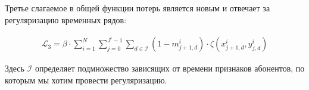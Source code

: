 \documentclass{article}
\begin{document}
Третье слагаемое в общей функции потерь является новым и отвечает за регуляризацию временных рядов: 

\begin{equation}
	\begin{aligned}
	\mathcal{L}_3=\beta\cdot\sum_{i=1}^N\sum_{j=0}^{J^i-1}\sum_{d\in\mathcal{I}}(1-m_{j+1,d}^i)\cdot\zeta(x_{j+1,d}^i,y_{j,d}^i)	
	\end{aligned}
\end{equation}		

Здесь $\mathcal{I}$ определяет подмножество зависящих от времени признаков абонентов, по которым мы хотим провести регуляризацию. 


\nocite{*}

\end{document}
